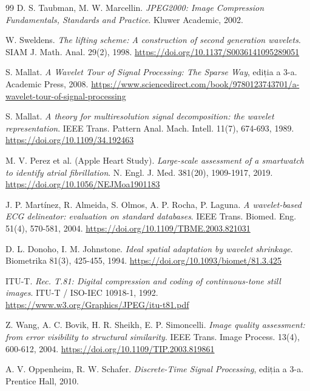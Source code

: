 \begin{thebibliography}{99}
 D. S. Taubman, M. W. Marcellin. \emph{JPEG2000:
  Image Compression Fundamentals, Standards and Practice}. Kluwer Academic,
  2002.

 W. Sweldens. \emph{The lifting scheme: A construction
  of second generation wavelets}. SIAM J. Math. Anal. 29(2), 1998.
  \url{https://doi.org/10.1137/S0036141095289051}

 S. Mallat. \emph{A Wavelet Tour of Signal Processing:
  The Sparse Way}, ediția a 3-a. Academic Press, 2008.
  \url{https://www.sciencedirect.com/book/9780123743701/a-wavelet-tour-of-signal-processing}

 S. Mallat. \emph{A theory for multiresolution signal
  decomposition: the wavelet representation}. IEEE Trans. Pattern Anal.
  Mach. Intell. 11(7), 674-693, 1989. \url{https://doi.org/10.1109/34.192463}

 M. V. Perez et al. (Apple Heart Study). \emph{Large-scale
  assessment of a smartwatch to identify atrial fibrillation}. N. Engl. J.
  Med. 381(20), 1909-1917, 2019. \url{https://doi.org/10.1056/NEJMoa1901183}

 J. P. Martínez, R. Almeida, S. Olmos, A. P. Rocha, P.
  Laguna. \emph{A wavelet-based ECG delineator: evaluation on standard
  databases}. IEEE Trans. Biomed. Eng. 51(4), 570-581, 2004.
  \url{https://doi.org/10.1109/TBME.2003.821031}

 D. L. Donoho, I. M. Johnstone. \emph{Ideal
  spatial adaptation by wavelet shrinkage}. Biometrika 81(3), 425-455, 1994.
  \url{https://doi.org/10.1093/biomet/81.3.425}

 ITU-T. \emph{Rec. T.81: Digital compression and coding of
  continuous-tone still images}. ITU-T / ISO-IEC 10918-1, 1992.
  \url{https://www.w3.org/Graphics/JPEG/itu-t81.pdf}

 Z. Wang, A. C. Bovik, H. R. Sheikh, E. P. Simoncelli.
  \emph{Image quality assessment: from error visibility to structural
  similarity}. IEEE Trans. Image Process. 13(4), 600-612, 2004.
  \url{https://doi.org/10.1109/TIP.2003.819861}

 A. V. Oppenheim, R. W. Schafer.
  \emph{Discrete-Time Signal Processing}, ediția a 3-a. Prentice Hall, 2010.

\end{thebibliography}
